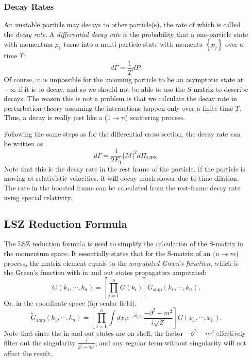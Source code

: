 \subsubsection{Decay Rates}
An unstable particle may decays to other particle(s), the rate of which is called the \textit{decay rate}.
A \textit{differential decay rate} is the probability that a one-particle state with momentum $p_{1}$ turns into a multi-particle state with momenta $\left\{p_{j}\right\}$ over a time $T$:
\begin{equation}
	d \Gamma=\frac{1}{T} d P .
\end{equation}
Of course, it is impossible for the incoming particle to be an asymptotic state at $-\infty$ if it is to decay, and so we should not be able to use the $S$-matrix to describe decays. 
The reason this is not a problem is that we calculate the decay rate in perturbation theory assuming the interactions happen only over a finite time $T$. 
Thus, a decay is really just like a ($1 \rightarrow n$) scattering process.

Following the same steps as for the differential cross section, the decay rate can be written as
\begin{equation}
	d \Gamma=\frac{1}{2 E_{1}}|\mathcal{M}|^{2} d \Pi_{\text {LIPS }}
\end{equation}
Note that this is the decay rate in the rest frame of the particle. 
If the particle is moving at relativistic velocities, it will decay much slower due to time dilation. 
The rate in the boosted frame can be calculated from the rest-frame decay rate using special relativity.





\subsection{LSZ Reduction Formula}

The LSZ reduction formula is used to simplify the calculation of the S-matrix in the momentum space.
It essentially states that for the S-matrix of an ($n \rightarrow m$) process, the matrix element equals to the \textit{amputated Green's function}, which is the Green's function with in and out states propagators amputated:
\begin{equation}
	\tilde{G}(k_1,\cdots,k_n) = \left[\prod_{i=1}^n \tilde{G}(k_i) \right] \tilde{G}_{\mathrm{amp}}(k_1,\cdots,k_n).
\end{equation}
Or, in the coordinate space (for scalar field), 
\begin{equation}
	\tilde{G}_{\mathrm{amp}}(k_1,\cdots,k_n) = \left[\prod_{i=1}^n \int d x_i e^{-i k_i x_i} \frac{-\partial^2-m^2}{i\sqrt Z} \right] G(x_1,\cdots,x_n).
\end{equation}
Note that since the in and out states are on-shell, the factor $-\partial^2-m^2$ effectively filter out the singularity $\frac{i}{k^2-m^2}$, and any regular term without singularity will not affect the result.


